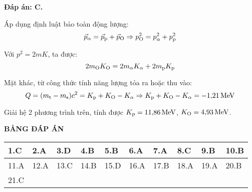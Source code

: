 \begin{enumerate}[label=\bfseries Câu \arabic*:]
\loigiai
{		\textbf{Đáp án: C.}
	
	Áp dụng định luật bảo toàn động lượng:
	$$\vec p_\alpha = \vec p_{\ce{p}} + \vec p_{\ce{O}} \Rightarrow p_{\ce{O}}^2 = p_{\alpha}^2 + p_{\ce{p}}^2$$
	
	Với $p^2=2mK$, ta được:
	$$2m_{\ce{O}} K_{\ce{O}} = 2m_{\alpha} K_{\alpha} + 2m_{\ce{p}} K_{\ce{p}}$$
	
	Mặt khác, từ công thức tính năng lượng tỏa ra hoặc thu vào:
	$$Q=(m_{\text t} - m_\text{s})c^2 = K_{\ce{p}} + K_{\ce{O}} - K_\alpha \Rightarrow K_{\ce{p}} + K_{\ce{O}} - K_\alpha = \SI{-1.21}{MeV}$$
	
	Giải hệ 2 phương trình trên, tính được $K_{\ce{p}} = \SI{11.86}{MeV}$, $K_{\ce{O}} = \SI{4.93}{MeV}$.
	
}
\end{enumerate}

\loigiai
{
	\begin{center}
		\textbf{BẢNG ĐÁP ÁN}
	\end{center}
	\begin{center}
		\begin{tabular}{|m{2.8em}|m{2.8em}|m{2.8em}|m{2.8em}|m{2.8em}|m{2.8em}|m{2.8em}|m{2.8em}|m{2.8em}|m{2.8em}|}
			\hline
			1.C  & 2.A  & 3.D  & 4.B  & 5.B  & 6.A  & 7.A & 8.C & 9.B & 10.B \\
			\hline
			11.A  & 12.A  & 13.C  & 14.B  & 15.D  & 16.A  & 17.B & 18.A & 19.A & 20.B \\
			\hline
			21.C  &  &  &  &  &  & & & & \\
			\hline
			
		\end{tabular}
	\end{center}
}

